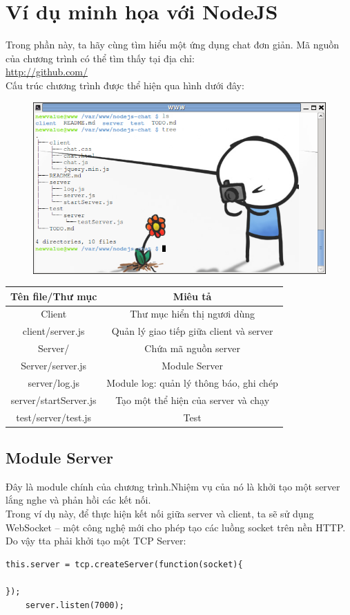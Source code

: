 ﻿\chapter{Ví dụ minh họa với NodeJS}
\label{Ví dụ minh họa với NodeJS}

Trong phần này, ta hãy cùng tìm hiểu một ứng dụng chat đơn giản. Mã nguồn của chương trình có thể tìm thấy tại địa chỉ:\\
	\url{http://github.com/}\\
Cấu trúc chương trình được thể hiện qua hình dưới đây:\\
	\begin{figure}[-h]
		\centering
		\includegraphics[scale=0.7]{4_1}
	\end{figure}
	
	\begin{tabular}{|c|c|}
		\hline
		Tên file/Thư mục & Miêu tả \\
		\hline
		Client & Thư mục hiển thị ngươi dùng \\
		\hline
		client/server.js & Quản lý giao tiếp giữa client và server \\
		\hline
		Server/ & Chứa mã nguồn server \\
		\hline
		Server/server.js & Module Server \\
		\hline
		server/log.js &	Module log: quản lý thông báo, ghi chép \\
		\hline
		server/startServer.js &	Tạo một thể hiện của server và chạy \\
		\hline
		test/server/test.js & Test \\
		\hline
	\end{tabular}
	
\section{Module Server}
	Đây là module chính của chương trình.Nhiệm vụ của nó là khởi tạo một server lắng nghe và phản hồi các kết nối.\\
	Trong ví dụ này, để thực hiện kết nối giữa server và client, ta sẽ sử dụng WebSocket – một công nghệ mới cho phép tạo các luồng socket trên nền HTTP. Do vậy tta phải khởi tạo một TCP Server:\\
	\begin{verbatim}
this.server = tcp.createServer(function(socket){

});
	server.listen(7000);
	\end{verbatim}
	
